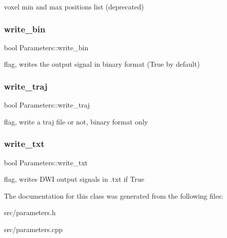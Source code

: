 voxel min and max positions list (deprecated) \mbox{\label{class_parameters_a4c98120687d1ba332d0c6cd5a14c59fb}} 
\subsubsection{\texorpdfstring{write\+\_\+bin}{write\_bin}}
{\footnotesize\ttfamily bool Parameters\+::write\+\_\+bin}

flag, writes the output signal in binary format (True by default) \mbox{\label{class_parameters_ac9408092b6254b4ccfecc85decbb1944}} 
\subsubsection{\texorpdfstring{write\+\_\+traj}{write\_traj}}
{\footnotesize\ttfamily bool Parameters\+::write\+\_\+traj}

flag, write a traj file or not, binary format only \mbox{\label{class_parameters_a15446bf0727ebfe03f119821c7d8ed0f}} 
\subsubsection{\texorpdfstring{write\+\_\+txt}{write\_txt}}
{\footnotesize\ttfamily bool Parameters\+::write\+\_\+txt}

flag, writes D\+WI output signals in .txt if True 

The documentation for this class was generated from the following files\+:\begin{DoxyCompactItemize}
\item 
src/parameters.\+h\item 
src/parameters.\+cpp\end{DoxyCompactItemize}
